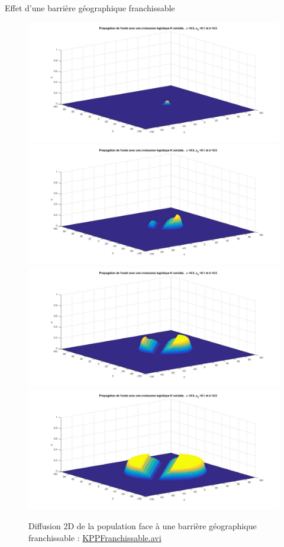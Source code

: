 \documentclass[10pt]{beamer}
\begin{document}
\begin{frame}{Effet d'une barrière géographique franchissable}{}
\begin{figure}[H]
	\centering
	\includegraphics[width=0.5\linewidth]{SimulationKPP/Enviro/montagne1}\hfill
	\includegraphics[width=0.5\linewidth]{SimulationKPP/Enviro/montagne3}\hfill
	\includegraphics[width=0.5\linewidth]{SimulationKPP/Enviro/montagne5}\hfill
	\includegraphics[width=0.5\linewidth]{SimulationKPP/Enviro/montagne8}
	\caption{Diffusion 2D de la population face à une barrière géographique franchissable : \url{KPPFranchissable.avi}}
\end{figure}
\end{frame}
\end{document}
